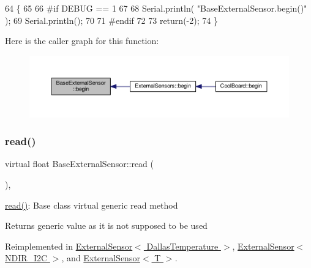 \begin{DoxyCode}
64     \{
65     
66 \textcolor{preprocessor}{    #if DEBUG == 1 }
67     
68         Serial.println( \textcolor{stringliteral}{"BaseExternalSensor.begin()"} );
69         Serial.println();
70     
71 \textcolor{preprocessor}{    #endif}
72 
73         \textcolor{keywordflow}{return}(-2);
74     \}
\end{DoxyCode}
Here is the caller graph for this function\+:
\nopagebreak
\begin{figure}[H]
\begin{center}
\leavevmode
\includegraphics[width=350pt]{classBaseExternalSensor_a87d132803d4f4fdd4e66332809f0c9a0_icgraph}
\end{center}
\end{figure}
\mbox{\label{classBaseExternalSensor_a1564f16deacf57b51b9948ac29db4291}} 
\subsubsection{\texorpdfstring{read()}{read()}}
{\footnotesize\ttfamily virtual float Base\+External\+Sensor\+::read (\begin{DoxyParamCaption}{ }\end{DoxyParamCaption})\hspace{0.3cm}{\ttfamily [inline]}, {\ttfamily [virtual]}}

\hyperlink{classBaseExternalSensor_a1564f16deacf57b51b9948ac29db4291}{read()}\+: Base class virtual generic read method

\begin{DoxyReturn}{Returns}
generic value as it is not supposed to be used 
\end{DoxyReturn}


Reimplemented in \hyperlink{classExternalSensor_3_01DallasTemperature_01_4_a1e725d9338314515d4e5dc456ed6a6c8}{External\+Sensor$<$ Dallas\+Temperature $>$}, \hyperlink{classExternalSensor_3_01NDIR__I2C_01_4_a239d18652e9fb4673842ae9726edf44f}{External\+Sensor$<$ N\+D\+I\+R\+\_\+\+I2\+C $>$}, and \hyperlink{classExternalSensor_a5fb3afc7d244fb86dac68ab5481bc407}{External\+Sensor$<$ T $>$}.



